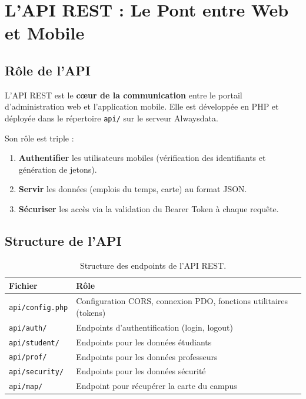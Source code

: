 \documentclass[12pt, a4paper]{report}
\begin{document}
\chapter{L'API REST : Le Pont entre Web et Mobile}

\section{Rôle de l'API}

L'API REST est le \textbf{c\oe{}ur de la communication} entre le portail d'administration web et l'application mobile. Elle est développée en PHP et déployée dans le répertoire \texttt{api/} sur le serveur Alwaysdata.

Son rôle est triple :
\begin{enumerate}
    \item \textbf{Authentifier} les utilisateurs mobiles (vérification des identifiants et génération de jetons).
    \item \textbf{Servir} les données (emplois du temps, carte) au format JSON.
    \item \textbf{Sécuriser} les accès via la validation du Bearer Token à chaque requête.
\end{enumerate}

\section{Structure de l'API}

\begin{table}[H]
\centering
\renewcommand{\arraystretch}{1.3}
\begin{tabularx}{\textwidth}{l X}
\toprule
\textbf{Fichier} & \textbf{Rôle} \\
\midrule
\texttt{api/config.php} & Configuration CORS, connexion PDO, fonctions utilitaires (tokens) \\
\texttt{api/auth/} & Endpoints d'authentification (login, logout) \\
\texttt{api/student/} & Endpoints pour les données étudiants \\
\texttt{api/prof/} & Endpoints pour les données professeurs \\
\texttt{api/security/} & Endpoints pour les données sécurité \\
\texttt{api/map/} & Endpoint pour récupérer la carte du campus \\
\bottomrule
\end{tabularx}
\caption{Structure des endpoints de l'API REST.}
\end{table}
\end{document}
